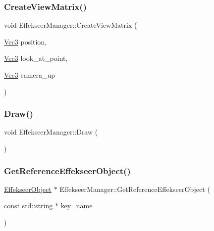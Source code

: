 \mbox{\label{class_effekseer_manager_ad36867f996af58d4b788a17cf25244a7}} 
\subsubsection{\texorpdfstring{Create\+View\+Matrix()}{CreateViewMatrix()}}
{\footnotesize\ttfamily void Effekseer\+Manager\+::\+Create\+View\+Matrix (\begin{DoxyParamCaption}\item[{\mbox{\hyperlink{_vector3_d_8h_ab16f59e4393f29a01ec8b9bbbabbe65d}{Vec3}}}]{position,  }\item[{\mbox{\hyperlink{_vector3_d_8h_ab16f59e4393f29a01ec8b9bbbabbe65d}{Vec3}}}]{look\+\_\+at\+\_\+point,  }\item[{\mbox{\hyperlink{_vector3_d_8h_ab16f59e4393f29a01ec8b9bbbabbe65d}{Vec3}}}]{camera\+\_\+up }\end{DoxyParamCaption})\hspace{0.3cm}{\ttfamily [static]}}

\mbox{\label{class_effekseer_manager_a0c9155e72b0552e5138e68be682a63a4}} 
\subsubsection{\texorpdfstring{Draw()}{Draw()}}
{\footnotesize\ttfamily void Effekseer\+Manager\+::\+Draw (\begin{DoxyParamCaption}{ }\end{DoxyParamCaption})\hspace{0.3cm}{\ttfamily [static]}}

\mbox{\label{class_effekseer_manager_a44878c9abb7f43521c7e8a9700668a28}} 
\subsubsection{\texorpdfstring{Get\+Reference\+Effekseer\+Object()}{GetReferenceEffekseerObject()}}
{\footnotesize\ttfamily \mbox{\hyperlink{class_effekseer_object}{Effekseer\+Object}} $\ast$ Effekseer\+Manager\+::\+Get\+Reference\+Effekseer\+Object (\begin{DoxyParamCaption}\item[{const std\+::string $\ast$}]{key\+\_\+name }\end{DoxyParamCaption})\hspace{0.3cm}{\ttfamily [static]}}

